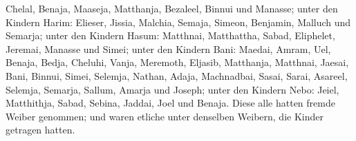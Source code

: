 Chelal, Benaja, Maaseja, Matthanja, Bezaleel, Binnui und Manasse;
 unter den Kindern Harim: Elieser, Jissia, Malchia, Semaja,
Simeon,  Benjamin, Malluch und Semarja;  unter
den Kindern Hasum: Matthnai, Matthattha, Sabad, Eliphelet, Jeremai,
Manasse und Simei;  unter den Kindern Bani: Maedai, Amram,
Uel,  Benaja, Bedja, Cheluhi,  Vanja,
Meremoth, Eljasib,  Matthanja, Matthnai, Jaesai,
 Bani, Binnui, Simei,  Selemja, Nathan, Adaja,
 Machnadbai, Sasai, Sarai,  Asareel, Selemja,
Semarja,  Sallum, Amarja und Joseph;  unter
den Kindern Nebo: Jeiel, Matthithja, Sabad, Sebina, Jaddai, Joel und
Benaja.  Diese alle hatten fremde Weiber genommen; und
waren etliche unter denselben Weibern, die Kinder getragen hatten.
